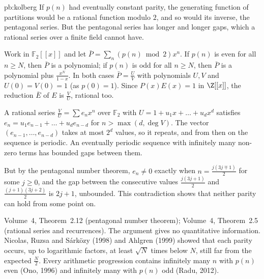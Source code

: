\begin{solution}{pb:kolberg}
\idea If $p(n)$ had eventually constant parity, the generating function of partitions would be a rational function modulo $2$, and
so would its inverse, the pentagonal series. But the pentagonal series has longer and longer gaps, which a rational series over
a finite field cannot have.

\writeup Work in $\mathbb F_2[[x]]$ and let $\bar P=\sum_n(p(n)\bmod2)x^n$. If $p(n)$ is even for all $n\ge N$, then $\bar P$ is a polynomial;
if $p(n)$ is odd for all $n\ge N$, then $\bar P$ is a polynomial plus $\frac{x^N}{1-x}$. In both cases $\bar P=\frac UV$ with polynomials
$U,V$ and $U(0)=V(0)=1$ (as $p(0)=1$). Since $P(x)E(x)=1$ in $\Z[[x]]$, the reduction $\bar E$ of $E$ is $\frac VU$, rational too.

A rational series $\frac VU=\sum e_nx^n$ over $\mathbb F_2$ with $U=1+u_1x+\dots+u_dx^d$ satisfies $e_n=u_1e_{n-1}+\dots+u_de_{n-d}$ for
$n>\max(d,\deg V)$. The vector $(e_{n-1},\dots,e_{n-d})$ takes at most $2^d$ values, so it repeats, and from then on the sequence
is periodic. An eventually periodic sequence with infinitely many non-zero terms has bounded gaps between them.

But by the pentagonal number theorem, $e_n\ne0$ exactly when $n=\frac{j(3j\mp1)}2$ for some $j\ge0$, and the gap between the
consecutive values $\frac{j(3j+1)}2$ and $\frac{(j+1)(3j+2)}2$ is $2j+1$, unbounded. This contradiction shows that neither parity
can hold from some point on.

\tools Volume~4, Theorem~2.12 (pentagonal number theorem); Volume~4, Theorem~2.5 (rational series and recurrences).
\leads The argument gives no quantitative information. Nicolas, Ruzsa and Sárközy (1998) and Ahlgren (1999) showed that each
parity occurs, up to logarithmic factors, at least $\sqrt N$ times below $N$, still far from the expected $\frac N2$. Every arithmetic
progression contains infinitely many $n$ with $p(n)$ even (Ono, 1996) and infinitely many with $p(n)$ odd (Radu, 2012).
\end{solution}

